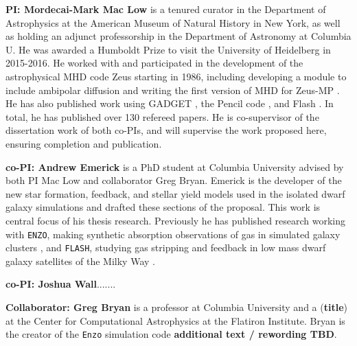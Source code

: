 \documentclass[11pt]{article}
\begin{document}
\textbf{PI: Mordecai-Mark Mac Low}  is a tenured curator in the Department of Astrophysics at the American
Museum of Natural History in New York, as well as holding an adjunct professorship in the Department of 
Astronomy at Columbia U.  He was awarded a Humboldt Prize to visit the University of Heidelberg in 2015-2016.
He worked with and participated in the
development of the astrophysical MHD code Zeus starting in 1986, including
developing a module to include ambipolar diffusion
\citep{MacLow1995,MacLowSmith1997} and writing the first version of MHD
for Zeus-MP 
\citep{Hayes2006}.  He has also published work using GADGET 
\citep{Li2005,Li2005a,Li2006},
the Pencil code 
\citep{Oishi2007,Johansen2007,Johansen2009,Yang2009,OishiMacLow2009,McNally2014}, and
Flash 
\citep{JoungMacLow2006,Joung2009,Peters2010,Peters2010a,Peters2010b,Peters2011,Peters2012,Hill2012,Gatto2015,Girichidis2015SImulatingOutflows,IbanezMejia16}.
In
total, he has published over 130 refereed papers. He is co-supervisor of the dissertation work of both co-PIs, and
will supervise the work proposed here, ensuring completion and publication.

\textbf{co-PI: Andrew Emerick} is a PhD student at Columbia University advised by both PI Mac Low and collaborator Greg Bryan. Emerick is the developer of the new star formation, feedback, and stellar yield models used in the isolated dwarf galaxy simulations and drafted these sections of the proposal. This work is central focus of his thesis research. Previously he has published research working with \texttt{ENZO}, making synthetic absorption observations of gas in simulated galaxy clusters \citep{Emerick2015}, and \texttt{FLASH}, studying gas stripping and feedback in low mass dwarf galaxy satellites of the Milky Way \citep{Emerick2016}.

\textbf{co-PI: Joshua Wall}.......

\textbf{Collaborator: Greg Bryan} is a professor at Columbia University and a ({\bf title}) at the Center for Computational Astrophysics at the Flatiron Institute. Bryan is the creator of the \texttt{Enzo} simulation code {\bf additional text / rewording TBD}.
\end{document}
